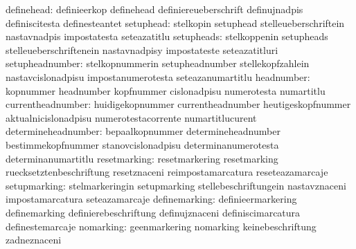                       definehead: definieerkop                     definehead
                                  definiereueberschrift            definujnadpis
                                  definiscitesta                   definesteantet
                       setuphead: stelkopin                        setuphead
                                  stelleueberschriftein            nastavnadpis
                                  impostatesta                     seteazatitlu
                      setupheads: stelkoppenin                     setupheads
                                  stelleueberschriftenein          nastavnadpisy
                                  impostateste                     seteazatitluri
                 setupheadnumber: stelkopnummerin                  setupheadnumber
                                  stellekopfzahlein                nastavcislonadpisu
                                  impostanumerotesta               seteazanumartitlu
                      headnumber: kopnummer                        headnumber
                                  kopfnummer                       cislonadpisu
                                  numerotesta                      numartitlu
               currentheadnumber: huidigekopnummer                 currentheadnumber
                                  heutigeskopfnummer               aktualnicislonadpisu
                                  numerotestacorrente              numartitlucurent
             determineheadnumber: bepaalkopnummer                  determineheadnumber
                                  bestimmekopfnummer               stanovcislonadpisu
                                  determinanumerotesta             determinanumartitlu
                    resetmarking: resetmarkering                   resetmarking
                                  ruecksetztenbeschriftung         resetznaceni
                                  reimpostamarcatura               reseteazamarcaje
                    setupmarking: stelmarkeringin                  setupmarking
                                  stellebeschriftungein            nastavznaceni
                                  impostamarcatura                 seteazamarcaje
                   definemarking: definieermarkering               definemarking
                                  definierebeschriftung            definujznaceni
                                  definiscimarcatura               definestemarcaje
                       nomarking: geenmarkering                    nomarking
                                  keinebeschriftung                zadneznaceni
